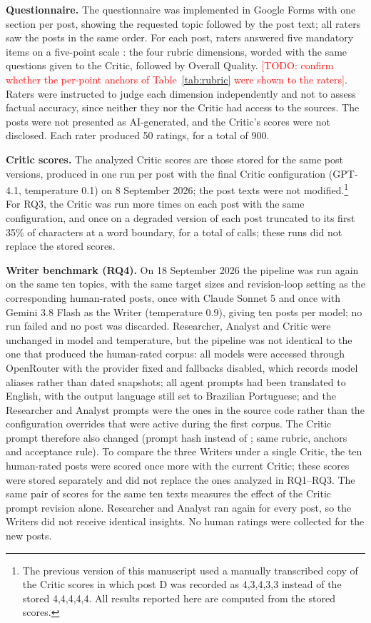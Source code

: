 \documentclass[a4paper,twoside]{article}
\newcommand{\TODO}[1]{\textcolor{red}{[TODO: #1]}}
\begin{document}
\textbf{Questionnaire.} The questionnaire was implemented in Google Forms with one section per post, showing the requested topic followed by the post text; all raters saw the posts in the same order. For each post, raters answered five mandatory items on a five-point scale \cite{likert1932technique,krosnick1999maximizing}: the four rubric dimensions, worded with the same questions given to the Critic, followed by Overall Quality. \TODO{confirm whether the per-point anchors of Table~\ref{tab:rubric} were shown to the raters}. Raters were instructed to judge each dimension independently and not to assess factual accuracy, since neither they nor the Critic had access to the sources. The posts were not presented as AI-generated, and the Critic's scores were not disclosed. Each rater produced 50 ratings, for a total of 900.

\textbf{Critic scores.} The analyzed Critic scores are those stored for the same post versions, produced in one run per post with the final Critic configuration (GPT-4.1, temperature 0.1) on 8 September 2026; the post texts were not modified.\footnote{The previous version of this manuscript used a manually transcribed copy of the Critic scores in which post D was recorded as 4,3,4,3,3 instead of the stored 4,4,4,4,4. All results reported here are computed from the stored scores.} For RQ3, the Critic was run \RepRuns{} more times on each post with the same configuration, and once on a degraded version of each post truncated to its first 35\% of characters at a word boundary, for a total of \RepCalls{} calls; these runs did not replace the stored scores.

\textbf{Writer benchmark (RQ4).} On 18 September 2026 the pipeline was run again on the same ten topics, with the same target sizes and revision-loop setting as the corresponding human-rated posts, once with Claude Sonnet 5 and once with Gemini 3.8 Flash as the Writer (temperature 0.9), giving ten posts per model; no run failed and no post was discarded. Researcher, Analyst and Critic were unchanged in model and temperature, but the pipeline was not identical to the one that produced the human-rated corpus: all models were accessed through OpenRouter with the provider fixed and fallbacks disabled, which records model aliases rather than dated snapshots; all agent prompts had been translated to English, with the output language still set to Brazilian Portuguese; and the Researcher and Analyst prompts were the ones in the source code rather than the configuration overrides that were active during the first corpus. The Critic prompt therefore also changed (prompt hash \BmNewHash{} instead of \BmOldHash{}; same rubric, anchors and acceptance rule). To compare the three Writers under a single Critic, the ten human-rated posts were scored once more with the current Critic; these scores were stored separately and did not replace the ones analyzed in RQ1--RQ3. The same pair of scores for the same ten texts measures the effect of the Critic prompt revision alone. Researcher and Analyst ran again for every post, so the Writers did not receive identical insights. No human ratings were collected for the new posts.
\end{document}
